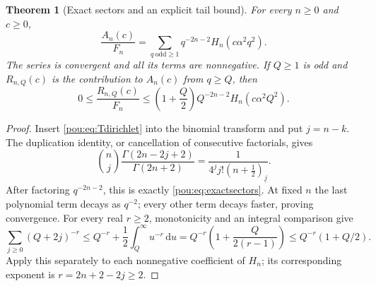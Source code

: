 \documentclass[11pt]{article}
\newtheorem{theorem}{Theorem}[section]
\theoremstyle{definition}
\theoremstyle{remark}
\newcommand{\dd}{\,\mathrm d}
\newcommand{\fall}[2]{(#1)_{\underline{#2}}}
\begin{document}
\begin{theorem}[Exact sectors and an explicit tail bound]\label{pou:thm:sectors}
For every $n\ge0$ and $c\ge0$,
\begin{equation}\label{pou:eq:exactsectors}
 \frac{A_n(c)}{F_n}
 =\sum_{q\ \mathrm{odd}\ge1}q^{-2n-2}H_n(c\alpha^2q^2).
\end{equation}
The series is convergent and all its terms are nonnegative.
If $Q\ge1$ is odd and $R_{n,Q}(c)$ is the contribution to $A_n(c)$
from $q\ge Q$, then
\begin{equation}\label{pou:eq:tailbound}
 0\le\frac{R_{n,Q}(c)}{F_n}
 \le \left(1+\frac Q2\right)
 Q^{-2n-2}H_n(c\alpha^2Q^2).
\end{equation}
\end{theorem}
\begin{proof}
Insert \eqref{pou:eq:Tdirichlet} into the binomial transform and put $j=n-k$.
The duplication identity, or cancellation of consecutive factorials, gives
\[
 \binom nj\frac{\Gamma(2n-2j+2)}{\Gamma(2n+2)}
 =\frac1{4^j j!\fall{n+\tfrac12}{j}}.
\]
After factoring $q^{-2n-2}$, this is exactly \eqref{pou:eq:exactsectors}.
At fixed $n$ the last polynomial term decays as $q^{-2}$; every other term
decays faster, proving convergence.
For every real $r\ge2$, monotonicity and an integral comparison give
\[
 \sum_{j\ge0}(Q+2j)^{-r}
 \le Q^{-r}+\frac12\int_Q^\infty u^{-r}\dd u
 =Q^{-r}\left(1+\frac{Q}{2(r-1)}\right)
 \le Q^{-r}(1+Q/2).
\]
Apply this separately to each nonnegative coefficient of $H_n$; its
corresponding exponent is $r=2n+2-2j\ge2$.
\end{proof}
\end{document}
